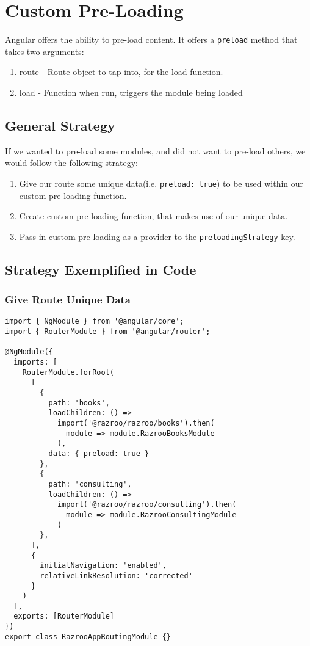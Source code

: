 \section{ Custom Pre-Loading }
Angular offers the ability to pre-load content. It offers a \lstinline{preload}
method that takes two arguments: 
\begin{enumerate}
  \item route - Route object to tap into, for the load function.
  \item load - Function when run, triggers the module being loaded
\end{enumerate}

\subsection{General Strategy}
If we wanted to pre-load some modules, and did not want to pre-load others, we
would follow the following strategy:
\begin{enumerate}
  \item Give our route some unique data(i.e. \lstinline{preload: true})
   to be used within our custom pre-loading function.
  \item Create custom pre-loading function, that makes use of our unique data. 
  \item Pass in custom pre-loading as a provider to the \lstinline{preloadingStrategy} 
  key.
\end{enumerate}

\subsection{Strategy Exemplified in Code}
\subsubsection{Give Route Unique Data}
\begin{lstlisting}[caption=app.routing.module.ts]
import { NgModule } from '@angular/core';
import { RouterModule } from '@angular/router';

@NgModule({
  imports: [
    RouterModule.forRoot(
      [
        {
          path: 'books',
          loadChildren: () =>
            import('@razroo/razroo/books').then(
              module => module.RazrooBooksModule
            ),
          data: { preload: true }
        },
        {
          path: 'consulting',
          loadChildren: () =>
            import('@razroo/razroo/consulting').then(
              module => module.RazrooConsultingModule
            )
        },
      ],
      {
        initialNavigation: 'enabled',
        relativeLinkResolution: 'corrected'
      }
    )
  ],
  exports: [RouterModule]
})
export class RazrooAppRoutingModule {}
\end{lstlisting}


